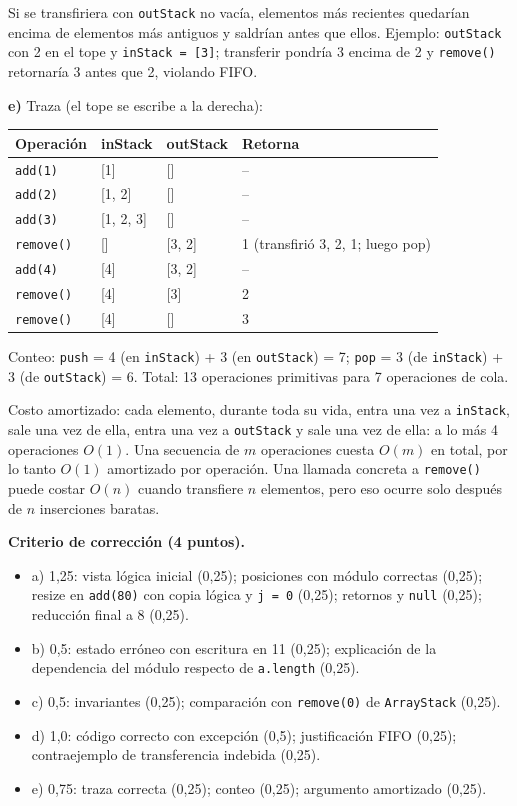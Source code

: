 \documentclass[11pt,a4paper]{article}
\begin{document}
Si se transfiriera con \texttt{outStack} no vacía, elementos más recientes quedarían encima de elementos más antiguos y saldrían antes que ellos. Ejemplo: \texttt{outStack} con 2 en el tope y \texttt{inStack = [3]}; transferir pondría 3 encima de 2 y \texttt{remove()} retornaría 3 antes que 2, violando FIFO.

\textbf{e)} Traza (el tope se escribe a la derecha):

\begin{center}
\small
\begin{tabular}{llll}
\toprule
\textbf{Operación} & \textbf{inStack} & \textbf{outStack} & \textbf{Retorna} \\
\midrule
\texttt{add(1)} & [1] & [] & -- \\
\texttt{add(2)} & [1, 2] & [] & -- \\
\texttt{add(3)} & [1, 2, 3] & [] & -- \\
\texttt{remove()} & [] & [3, 2] & 1 (transfirió 3, 2, 1; luego pop) \\
\texttt{add(4)} & [4] & [3, 2] & -- \\
\texttt{remove()} & [4] & [3] & 2 \\
\texttt{remove()} & [4] & [] & 3 \\
\bottomrule
\end{tabular}
\end{center}

Conteo: \texttt{push} = 4 (en \texttt{inStack}) + 3 (en \texttt{outStack}) = 7; \texttt{pop} = 3 (de \texttt{inStack}) + 3 (de \texttt{outStack}) = 6. Total: 13 operaciones primitivas para 7 operaciones de cola.

Costo amortizado: cada elemento, durante toda su vida, entra una vez a \texttt{inStack}, sale una vez de ella, entra una vez a \texttt{outStack} y sale una vez de ella: a lo más 4 operaciones $O(1)$. Una secuencia de $m$ operaciones cuesta $O(m)$ en total, por lo tanto $O(1)$ amortizado por operación. Una llamada concreta a \texttt{remove()} puede costar $O(n)$ cuando transfiere $n$ elementos, pero eso ocurre solo después de $n$ inserciones baratas.

\textbf{Criterio de corrección (4 puntos).}
\begin{itemize}[itemsep=0pt]
\item a) 1,25: vista lógica inicial (0,25); posiciones con módulo correctas (0,25); resize en \texttt{add(80)} con copia lógica y \texttt{j = 0} (0,25); retornos y \texttt{null} (0,25); reducción final a 8 (0,25).
\item b) 0,5: estado erróneo con escritura en 11 (0,25); explicación de la dependencia del módulo respecto de \texttt{a.length} (0,25).
\item c) 0,5: invariantes (0,25); comparación con \texttt{remove(0)} de \texttt{ArrayStack} (0,25).
\item d) 1,0: código correcto con excepción (0,5); justificación FIFO (0,25); contraejemplo de transferencia indebida (0,25).
\item e) 0,75: traza correcta (0,25); conteo (0,25); argumento amortizado (0,25).
\end{itemize}
\end{document}
